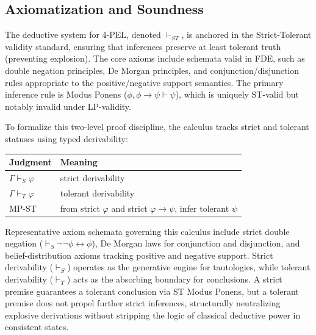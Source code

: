 \documentclass[11pt,a4paper]{article}
\begin{document}
\subsection{Axiomatization and Soundness}
The deductive system for 4-PEL, denoted $\vdash_{ST}$, is anchored in the Strict-Tolerant validity standard, ensuring that inferences preserve at least tolerant truth (preventing explosion). The core axioms include schemata valid in FDE, such as double negation principles, De Morgan principles, and conjunction/disjunction rules appropriate to the positive/negative support semantics. The primary inference rule is Modus Ponens ($\phi, \phi \to \psi \vdash \psi$), which is uniquely ST-valid but notably invalid under LP-validity.

To formalize this two-level proof discipline, the calculus tracks strict and tolerant statuses using typed derivability:
\begin{table}[ht]
\centering
\begin{tabular}{ll}
\hline
\textbf{Judgment} & \textbf{Meaning} \\
\hline
$\Gamma \vdash_S \varphi$ & strict derivability \\
$\Gamma \vdash_T \varphi$ & tolerant derivability \\
MP-ST & from strict $\varphi$ and strict $\varphi \to \psi$, infer tolerant $\psi$ \\
\hline
\end{tabular}
\end{table}

Representative axiom schemata governing this calculus include strict double negation ($\vdash_S \neg\neg\phi \leftrightarrow \phi$), De Morgan laws for conjunction and disjunction, and belief-distribution axioms tracking positive and negative support. Strict derivability ($\vdash_S$) operates as the generative engine for tautologies, while tolerant derivability ($\vdash_T$) acts as the absorbing boundary for conclusions. A strict premise guarantees a tolerant conclusion via ST Modus Ponens, but a tolerant premise does not propel further strict inferences, structurally neutralizing explosive derivations without stripping the logic of classical deductive power in consistent states.
\end{document}
